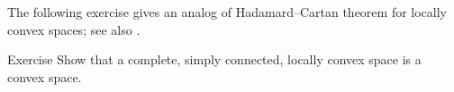 The following exercise gives an analog of Hadamard--Cartan theorem for locally convex spaces;
see also \cite{a-b:h-c}.

\begin{thm}{Exercise}\label{ex:cats-cradle}
Show that a complete, simply connected, locally convex space is a convex space.
\end{thm}













